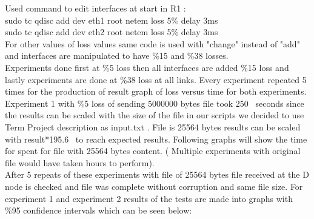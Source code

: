 \documentclass[conference]{IEEEtran}
\begin{document}
Used command to edit interfaces at start in R1 :\\ 

sudo tc qdisc add dev eth1 root netem loss 5\% delay 3ms \\
sudo tc qdisc add dev eth2 root netem loss 5\% delay 3ms \\

For other values of loss values same code is used with "change" instead of "add" and interfaces are manipulated to have \%15 and \%38 losses.\\

Experiments done first at \%5 loss then all interfaces are added \%15 loss and lastly experiments are done at \%38 loss at all links. Every experiment repeated 5 times for the production of result graph of loss versus time for both experiments.\\

Experiment 1 with \%5 loss of sending 5000000 bytes file took 250~ seconds since the results can be scaled with the size of the file in our scripts we decided to use Term Project description as input.txt . File is 25564 bytes results can be scaled with result*195.6~ to reach expected results. Following graphs will show the time for spent for file with 25564 bytes content. ( Multiple experiments with original file would have taken hours to perform). \\

After 5 repeats of these experiments with file of 25564 bytes file received at the D node is checked and file was complete without corruption and same file size. For experiment 1 and experiment 2 results of the tests are made into  graphs with \%95 confidence intervals which can be seen below:\\
\end{document}

